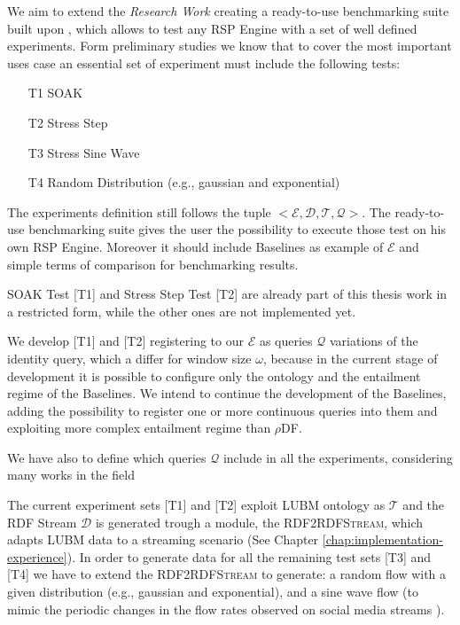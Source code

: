 \noindent We aim to extend the \textit{Research Work} creating a ready-to-use benchmarking suite built upon \namens, which allows to test any RSP Engine with a set of well defined experiments. Form preliminary studies we know that to cover the most important uses case an essential set of experiment must include the following tests:
\begin{itemize}
\item[T1] SOAK
\item[T2] Stress Step
\item[T3] Stress Sine Wave
\item[T4] Random Distribution (e.g., gaussian and exponential)
\end{itemize}

The experiments definition still follows the tuple $<\mathcal{E},\mathcal{D},\mathcal{T},\mathcal{Q}>$. The ready-to-use benchmarking suite gives the user the possibility to execute those test on his own RSP Engine. Moreover it should include \name Baselines as example of $\mathcal{E}$ and simple terms of comparison for benchmarking results.

SOAK Test [T1] and Stress Step Test [T2] are already part of this thesis work in a restricted form, while the other ones are not implemented yet. 

We develop [T1] and [T2] registering to our $\mathcal{E}$ as queries $\mathcal{Q}$ variations of the identity query, which a differ for window size $\omega$, because in the current stage of development it is possible to configure only the ontology and the entailment regime of the Baselines. We intend to continue the development of the Baselines, adding the possibility to register one or more continuous queries into them and exploiting more complex entailment regime than $\rho$DF. 

We have also to define which queries $\mathcal{Q}$ include in all the experiments, considering many works in the field \cite{DBLP:conf/esws/ScharrenbachUMVB13, Zhang2012, LePhuoc2012c, DBLP:conf/semweb/DellAglioCBCV13}

The current experiment sets [T1] and [T2] exploit LUBM ontology as $\mathcal{T}$ and the RDF Stream $\mathcal{D}$ is generated trough a module, the \textsc{RDF2RDFStream}, which adapts LUBM data to a streaming scenario (See Chapter \ref{chap:implementation-experience}). In order to generate data for all the remaining test sets [T3] and [T4] we have to extend the \textsc{RDF2RDFStream} to generate: a random flow with a given distribution (e.g., gaussian and exponential), and a sine wave flow (to mimic the periodic changes in the flow rates observed on social media streams \cite{DBLP:conf/semweb/BalduiniVDTPC13}).

